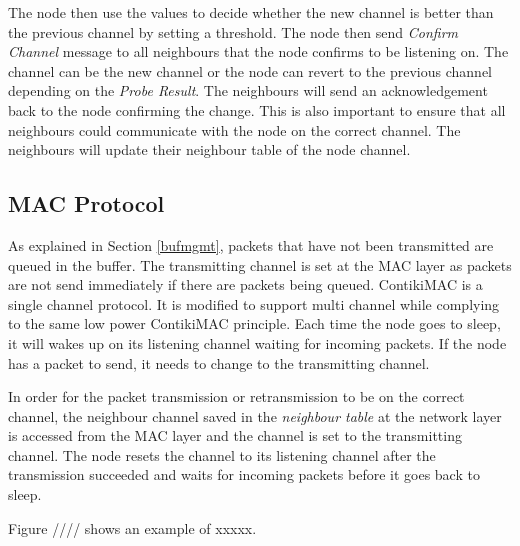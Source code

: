 The node then use the values to decide whether the new channel is better than the previous channel by setting a threshold. The node then send \textit{Confirm Channel} message to all neighbours that the node confirms to be listening on. The channel can be the new channel or the node can revert to the previous channel depending on the \textit{Probe Result}. The neighbours will send an acknowledgement back to the node confirming the change. This is also important to ensure that all neighbours could communicate with the node on the correct channel. The neighbours will update their neighbour table of the node channel. 

\subsection{MAC Protocol}
As explained in Section \ref{bufmgmt}, packets that have not been transmitted are queued in the buffer. The transmitting channel is set at the MAC layer as packets are not send immediately if there are packets being queued. ContikiMAC is a single channel protocol. It is modified to support multi channel while complying to the same low power ContikiMAC principle. Each time the node goes to sleep, it will wakes up on its listening channel waiting for incoming packets. If the node has a packet to send, it needs to change to the transmitting channel.

In order for the packet transmission or retransmission to be on the correct channel, the neighbour channel saved in the \textit{neighbour table} at the network layer is accessed from the MAC layer and the channel is set to the transmitting channel. The node resets the channel to its listening channel after the transmission succeeded and waits for incoming packets before it goes back to sleep.

Figure //// shows an example of xxxxx.



